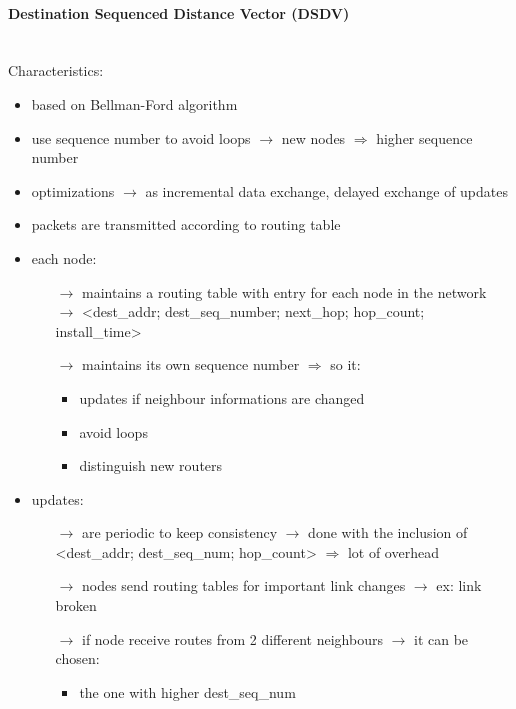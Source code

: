 \paragraph{Destination Sequenced Distance Vector (DSDV)}\mbox{}\\[0.2cm]
Characteristics:
\begin{itemize}
    \item based on Bellman-Ford algorithm
    \item use sequence number to avoid loops $\rightarrow$ new nodes $\Rightarrow$ higher sequence \mbox{number}
    \item optimizations $\rightarrow$ as incremental data exchange, delayed exchange of updates
    \item packets are transmitted according to routing table
    \item each node:
    \begin{itemize}
        \item[$\rightarrow$] maintains a routing table with entry for each node in the network\\
        $\rightarrow$ <dest\_addr; dest\_seq\_number; next\_hop; hop\_count; install\_time>
        \item[$\rightarrow$] maintains its own sequence number $\Rightarrow$ so it:
        \begin{itemize}
            \item updates if neighbour informations are changed
            \item avoid loops
            \item distinguish new routers
        \end{itemize}
    \end{itemize}
    \item updates:
    \begin{itemize}
        \item[$\rightarrow$] are periodic to keep consistency $\rightarrow$ done with the inclusion of\\<dest\_addr; dest\_seq\_num; hop\_count> $\Rightarrow$ lot of overhead
        \item[$\rightarrow$] nodes send routing tables for important link changes $\rightarrow$ ex: link broken
        \item[$\rightarrow$] if node receive routes from 2 different neighbours $\rightarrow$ it can be chosen:
        \begin{itemize}
            \item the one with higher dest\_seq\_num

\end{itemize}
\end{itemize}
\end{itemize}
